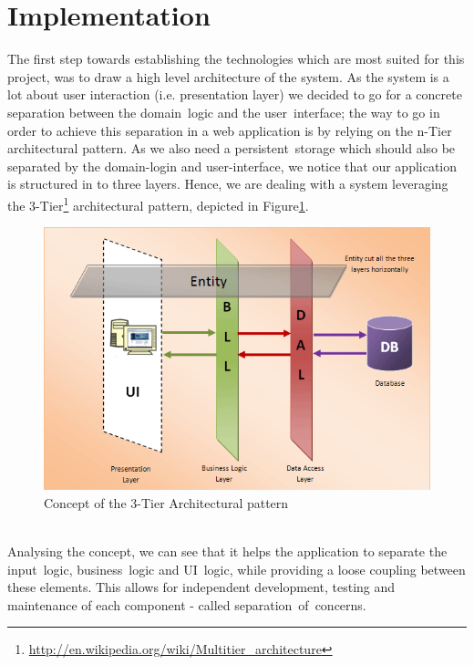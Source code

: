 \section{Implementation}
\label{sec.implementation}
\noindent The first step towards establishing the technologies which are most suited for this project, was to draw a high level architecture of the system. As the system is a lot about user interaction (i.e. presentation layer) we decided to go for a concrete separation between the domain~logic and the user~interface; the way to go in order to achieve this separation in a web application is by relying on the n-Tier architectural pattern. As we also need a persistent~storage which should also be separated by the domain-login and user-interface, we notice that our application is structured in to three layers. Hence, we are dealing with a system leveraging the 3-Tier\footnote{\url{http://en.wikipedia.org/wiki/Multitier_architecture}} architectural pattern, depicted in Figure\ref{fig.setup}.
\begin{figure}[H] 
	\centering
	\includegraphics[width=\linewidth]{fig/3tier2}
	\caption{Concept of the 3-Tier Architectural pattern}
	\label{fig.setup}
\end{figure}
\\

\noindent Analysing the concept, we can see that it helps the application to separate the input~logic, business~logic and UI~logic, while providing a loose coupling between these elements. This allows for independent development, testing and maintenance of each component - called separation~of~concerns.
\\

